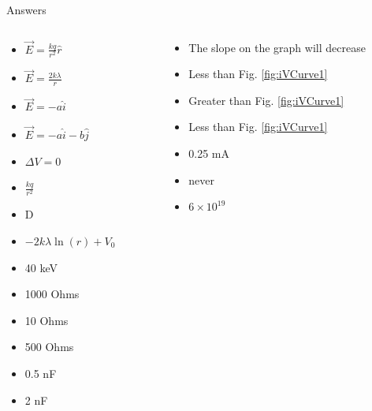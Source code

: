\documentclass{beamer}
\begin{document}
\begin{frame}{Answers}
\tiny
\begin{columns}[T]
\begin{column}{0.5\textwidth}
\begin{itemize}
\item $\vec{E} = \frac{kq}{r^2}\hat{r}$
\item $\vec{E} = \frac{2k\lambda}{r}$
\item $\vec{E} = -a\hat{i}$
\item $\vec{E} = -a\hat{i}-b\hat{j}$
\item $\Delta V = 0$
\item $\frac{kq}{r^2}$
\item D
\item $-2k\lambda\ln(r) + V_0$
\item 40 keV
\item 1000 Ohms
\item 10 Ohms
\item 500 Ohms
\item 0.5 nF
\item 2 nF
\end{itemize}
\end{column}
\begin{column}{0.5\textwidth}
\begin{itemize}
\item The slope on the graph will decrease
\item Less than Fig. \ref{fig:iVCurve1}
\item Greater than Fig. \ref{fig:iVCurve1}
\item Less than Fig. \ref{fig:iVCurve1}
\item 0.25 mA
\item never
\item $6 \times 10^{19}$
\end{itemize}
\end{column}
\end{columns}
\end{frame}
\end{document}
